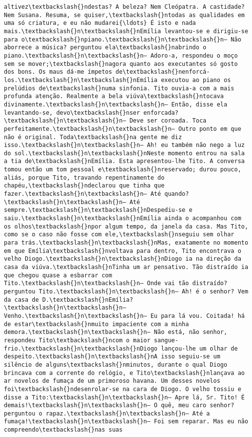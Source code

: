 \documentclass[11pt]{article}
\begin{document}
\begin{Verbatim}[commandchars=\\\{\}]
altivez\textbackslash{}ndestas? A beleza? Nem Cleópatra. A castidade? Nem Susana. Resuma, se quiser,\textbackslash{}ntodas as qualidades em uma só criatura, e eu não mudarei{\ldots} É isto e nada mais.\textbackslash{}n\textbackslash{}nEmília levantou-se e dirigiu-se para o\textbackslash{}npiano.\textbackslash{}n\textbackslash{}n— Não aborrece a música? perguntou ela\textbackslash{}nabrindo o piano.\textbackslash{}n\textbackslash{}n— Adoro-a, respondeu o moço sem se mover;\textbackslash{}nagora quanto aos executantes só gosto dos bons. Os maus dá-me ímpetos de\textbackslash{}nenforcá-los.\textbackslash{}n\textbackslash{}nEmília executou ao piano os prelúdios de\textbackslash{}numa sinfonia. Tito ouvia-a com a mais profunda atenção. Realmente a bela viúva\textbackslash{}ntocava divinamente.\textbackslash{}n\textbackslash{}n— Então, disse ela levantando-se, devo\textbackslash{}nser enforcada?\textbackslash{}n\textbackslash{}n— Deve ser coroada. Toca perfeitamente.\textbackslash{}n\textbackslash{}n— Outro ponto em que não é original. Toda\textbackslash{}na gente me diz isso.\textbackslash{}n\textbackslash{}n— Ah! eu também não nego a luz do sol.\textbackslash{}n\textbackslash{}nNeste momento entrou na sala a tia de\textbackslash{}nEmília. Esta apresentou-lhe Tito. A conversa tomou então um tom pessoal e\textbackslash{}nreservado; durou pouco, aliás, porque Tito, travando repentinamente do chapéu,\textbackslash{}ndeclarou que tinha que fazer.\textbackslash{}n\textbackslash{}n— Até quando?\textbackslash{}n\textbackslash{}n— Até sempre.\textbackslash{}n\textbackslash{}nDespediu-se e saiu.\textbackslash{}n\textbackslash{}nEmília ainda o acompanhou com os olhos\textbackslash{}npor algum tempo, da janela da casa. Mas Tito, como se o caso não fosse com ele,\textbackslash{}nseguiu sem olhar para trás.\textbackslash{}n\textbackslash{}nMas, exatamente no momento em que Emília\textbackslash{}nvoltava para dentro, Tito encontrava o velho Diogo.\textbackslash{}n\textbackslash{}nDiogo ia na direção da casa da viúva.\textbackslash{}nTinha um ar pensativo. Tão distraído ia que chegou quase a esbarrar com Tito.\textbackslash{}n\textbackslash{}n— Onde vai tão distraído? perguntou Tito.\textbackslash{}n\textbackslash{}n— Ah! é o senhor? Vem da casa de D.\textbackslash{}nEmília?\textbackslash{}n\textbackslash{}n— Venho.\textbackslash{}n\textbackslash{}n— Eu para lá vou. Coitada! há de estar\textbackslash{}nmuito impaciente com a minha demora.\textbackslash{}n\textbackslash{}n— Não está, não senhor, respondeu Tito\textbackslash{}ncom o maior sangue-frio.\textbackslash{}n\textbackslash{}nDiogo lançou-lhe um olhar de despeito.\textbackslash{}n\textbackslash{}nA isso seguiu-se um silêncio de alguns\textbackslash{}nminutos, durante o qual Diogo brincava com a corrente do relógio, e Tito\textbackslash{}nlançava ao ar novelos de fumaça de um primoroso havana. Um desses novelos foi\textbackslash{}ndesenrolar-se na cara de Diogo. O velho tossiu e disse a Tito:\textbackslash{}n\textbackslash{}n— Apre lá, Sr. Tito! É demais!\textbackslash{}n\textbackslash{}n— O quê, meu caro senhor? perguntou o rapaz.\textbackslash{}n\textbackslash{}n— Até a fumaça!\textbackslash{}n\textbackslash{}n— Foi sem reparar. Mas eu não compreendo\textbackslash{}nas suas 
\end{Verbatim}
\end{document}
